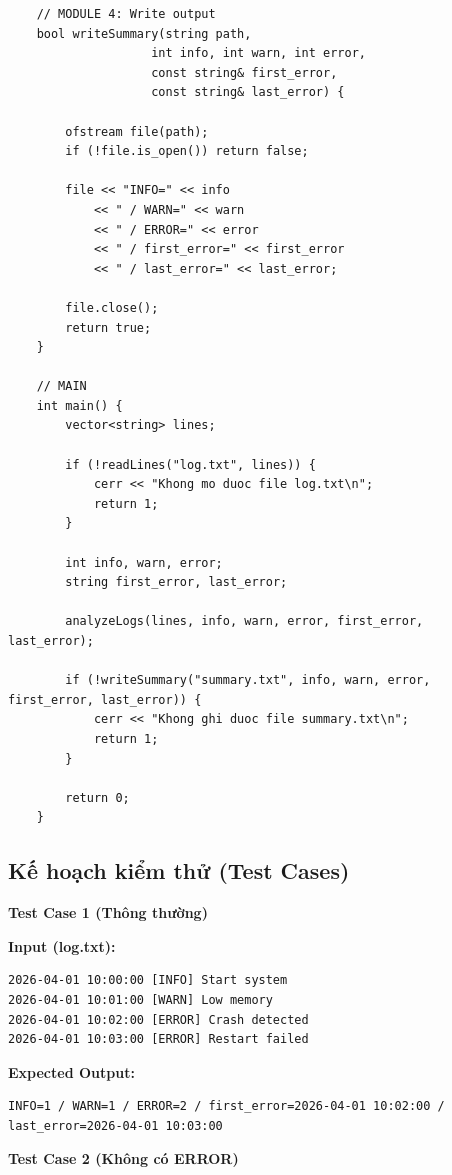 \begin{lstlisting}
    // MODULE 4: Write output
    bool writeSummary(string path,
                    int info, int warn, int error,
                    const string& first_error,
                    const string& last_error) {

        ofstream file(path);
        if (!file.is_open()) return false;

        file << "INFO=" << info
            << " / WARN=" << warn
            << " / ERROR=" << error
            << " / first_error=" << first_error
            << " / last_error=" << last_error;

        file.close();
        return true;
    }

    // MAIN
    int main() {
        vector<string> lines;

        if (!readLines("log.txt", lines)) {
            cerr << "Khong mo duoc file log.txt\n";
            return 1;
        }

        int info, warn, error;
        string first_error, last_error;

        analyzeLogs(lines, info, warn, error, first_error, last_error);

        if (!writeSummary("summary.txt", info, warn, error, first_error, last_error)) {
            cerr << "Khong ghi duoc file summary.txt\n";
            return 1;
        }

        return 0;
    }
\end{lstlisting}

\subsection{Kế hoạch kiểm thử (Test Cases)}

\textbf{Test Case 1 (Thông thường)}

\textbf{Input (log.txt):}
\begin{lstlisting}
2026-04-01 10:00:00 [INFO] Start system
2026-04-01 10:01:00 [WARN] Low memory
2026-04-01 10:02:00 [ERROR] Crash detected
2026-04-01 10:03:00 [ERROR] Restart failed
\end{lstlisting}

\textbf{Expected Output:}
\begin{lstlisting}
INFO=1 / WARN=1 / ERROR=2 / first_error=2026-04-01 10:02:00 / last_error=2026-04-01 10:03:00
\end{lstlisting}

\vspace{0.5cm}

\textbf{Test Case 2 (Không có ERROR)}

